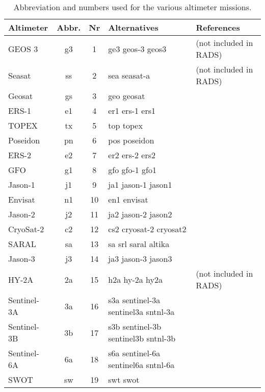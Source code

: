 \begin{table}
\begin{tabular}{lccll}
\hline
Altimeter & Abbr. & Nr & Alternatives & References \\
\hline
GEOS 3      & g3 &  1 & ge3 geos-3 geos3                    & (not included in RADS) \\
Seasat      & ss &  2 & sea seasat-a                        & (not included in RADS) \\
Geosat      & gs &  3 & geo geosat                          & \\
ERS-1       & e1 &  4 & er1 ers-1 ers1                      & \citep{francis1990a,francis1991a} \\
TOPEX       & tx &  5 & top topex                           & \citep{fu1994} \\
Poseidon    & pn &  6 & pos poseidon                        & \\
ERS-2       & e2 &  7 & er2 ers-2 ers2                      & \citep{francis1995a} \\
GFO         & g1 &  8 & gfo gfo-1 gfo1                      & \\
Jason-1     & j1 &  9 & ja1 jason-1 jason1                  & \citep{menard2003} \\
Envisat     & n1 & 10 & en1 envisat                         & \\
Jason-2     & j2 & 11 & ja2 jason-2 jason2                  & \citep{lambin2010} \\
CryoSat-2   & c2 & 12 & cs2 cryosat-2 cryosat2              & \citep{wingham2006} \\
SARAL       & sa & 13 & sa srl saral altika                 & \\
Jason-3     & j3 & 14 & ja3 jason-3 jason3                  & \\
HY-2A       & 2a & 15 & h2a hy-2a hy2a                      & (not included in RADS) \\
Sentinel-3A & 3a & 16 & s3a sentinel-3a sentinel3a sntnl-3a & \\
Sentinel-3B & 3b & 17 & s3b sentinel-3b sentinel3b sntnl-3b & \\
Sentinel-6A & 6a & 18 & s6a sentinel-6a sentinel6a sntnl-6a & \\
SWOT        & sw & 19 & swt swot                            & \\
\hline
\end{tabular}
\caption{Abbreviation and numbers used for the various altimeter missions.}
\label{tab:rads4_sats}
\end{table}
